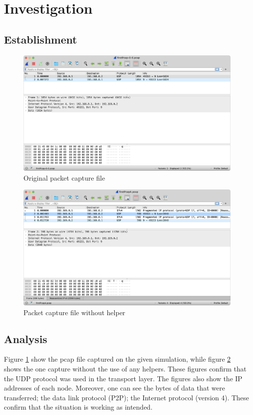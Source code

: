 \documentclass[a4paper, 12pt]{article}
\begin{document}
\section{Investigation}
\label{section:investigation}

\subsection{Establishment}
\begin{figure}[hbt]
 \includegraphics[width=\textwidth,height=\textheight,keepaspectratio]{./images/firstpcap0}
  \caption{Original packet capture file}
  \label{fig:firstpcap0}
\end{figure}

\begin{figure}[hbt]
 \includegraphics[width=\textwidth,height=\textheight,keepaspectratio]{./images/firstpcapa}
  \caption{Packet capture file without helper}
  \label{fig:firstpcapa}
\end{figure}

\subsection{Analysis}
Figure \ref{fig:firstpcap0} show the pcap file captured on the given simulation, while figure \ref{fig:firstpcapa} shows the one capture without the use of any helpers. These figures confirm that the UDP protocol was used in the transport layer. The figures also show the IP addresses of each node. Moreover, one can see the bytes of data that were transferred; the data link protocol (P2P); the Internet protocol (version 4). These confirm that the situation is working as intended.



 
\end{document}

